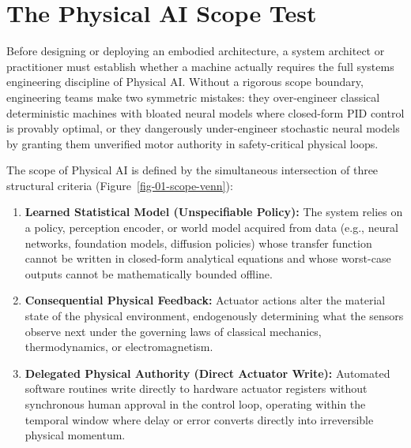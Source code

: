 \documentclass[
  10pt,
  letterpaper,
  twoside,
  openright,
  numbers=noenddot,
  headings=standardclasses
]{scrbook}
\begin{document}
\section{The Physical AI Scope Test}\label{sec-boundary-1-4}

Before designing or deploying an embodied architecture, a system
architect or practitioner must establish whether a machine actually
requires the full systems engineering discipline of Physical AI. Without
a rigorous scope boundary, engineering teams make two symmetric
mistakes: they over-engineer classical deterministic machines with
bloated neural models where closed-form PID control is provably optimal,
or they dangerously under-engineer stochastic neural models by granting
them unverified motor authority in safety-critical physical loops.

The scope of Physical AI is defined by the simultaneous intersection of
three structural criteria (Figure~\ref{fig-01-scope-venn}):

\begin{enumerate}
\def\labelenumi{\arabic{enumi}.}
\tightlist
\item
  \textbf{Learned Statistical Model (Unspecifiable Policy):} The system
  relies on a policy, perception encoder, or world model acquired from
  data (e.g., neural networks, foundation models, diffusion policies)
  whose transfer function cannot be written in closed-form analytical
  equations and whose worst-case outputs cannot be mathematically
  bounded offline.
\item
  \textbf{Consequential Physical Feedback:} Actuator actions alter the
  material state of the physical environment, endogenously determining
  what the sensors observe next under the governing laws of classical
  mechanics, thermodynamics, or electromagnetism.
\item
  \textbf{Delegated Physical Authority (Direct Actuator Write):}
  Automated software routines write directly to hardware actuator
  registers without synchronous human approval in the control loop,
  operating within the temporal window where delay or error converts
  directly into irreversible physical momentum.
\end{enumerate}
\end{document}
